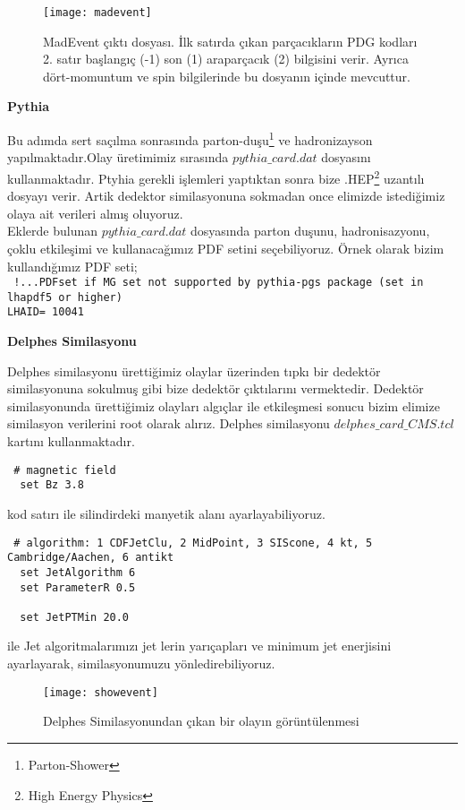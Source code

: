 \begin{figure}
\centering
\texttt{[image: madevent]}
\caption{MadEvent çıktı dosyası. İlk satırda çıkan parçacıkların PDG kodları 2. satır başlangıç (-1) son (1) araparçacık (2) bilgisini verir. Ayrıca dört-momuntum ve spin bilgilerinde bu dosyanın içinde mevcuttur.}
\end{figure}

\par \textbf{Pythia}
\par Bu adımda sert saçılma sonrasında parton-duşu\footnote{Parton-Shower} ve hadronizayson yapılmaktadır.Olay üretimimiz sırasında $pythia\_card.dat$ dosyasını kullanmaktadır. Ptyhia gerekli işlemleri yaptıktan sonra bize .HEP\footnote{High Energy Physics} uzantılı dosyayı verir. Artik dedektor similasyonuna sokmadan once elimizde istediğimiz olaya ait verileri almış oluyoruz. \\
Eklerde bulunan $pythia\_card.dat$ dosyasında parton duşunu, hadronisazyonu, çoklu etkileşimi ve kullanacağımız PDF setini seçebiliyoruz. Örnek olarak bizim kullandığımız PDF seti; \\
 \texttt{
	!...PDFset if MG set not supported by pythia-pgs package (set in lhapdf5 or higher)
   \\ LHAID= 10041
      }
\par \textbf{Delphes Similasyonu}
\par Delphes similasyonu ürettiğimiz olaylar üzerinden tıpkı bir dedektör similasyonuna sokulmuş gibi bize dedektör çıktılarını vermektedir. Dedektör similasyonunda ürettiğimiz olayları algıçlar ile etkileşmesi sonucu bizim elimize similasyon verilerini root olarak alırız. Delphes similasyonu $delphes\_card\_CMS.tcl$ kartını kullanmaktadır.
\begin{lstlisting}
 # magnetic field
  set Bz 3.8
\end{lstlisting}
kod satırı ile silindirdeki manyetik alanı ayarlayabiliyoruz.
\begin{lstlisting}
 # algorithm: 1 CDFJetClu, 2 MidPoint, 3 SIScone, 4 kt, 5 Cambridge/Aachen, 6 antikt
  set JetAlgorithm 6
  set ParameterR 0.5

  set JetPTMin 20.0
\end{lstlisting}
ile Jet algoritmalarımızı jet lerin yarıçapları ve minimum jet enerjisini ayarlayarak, similasyonumuzu yönledirebiliyoruz.
\begin{figure}[!h]
\texttt{[image: showevent]}
\centering
\caption{Delphes Similasyonundan çıkan bir olayın görüntülenmesi}
\label{fig:showevent}
\end{figure}
